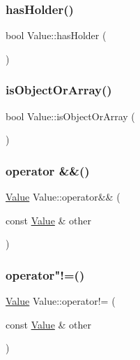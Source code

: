 \mbox{\label{classValue_a9193333ebda6a44b426ebc24519473db}} 
\subsubsection{\texorpdfstring{has\+Holder()}{hasHolder()}}
{\footnotesize\ttfamily bool Value\+::has\+Holder (\begin{DoxyParamCaption}{ }\end{DoxyParamCaption})}

\mbox{\label{classValue_a37e1fe6c86dc755a3e000442c4949ab7}} 
\subsubsection{\texorpdfstring{is\+Object\+Or\+Array()}{isObjectOrArray()}}
{\footnotesize\ttfamily bool Value\+::is\+Object\+Or\+Array (\begin{DoxyParamCaption}{ }\end{DoxyParamCaption})}

\mbox{\label{classValue_a8550d0a2396c3222421fdd1aef7ff49b}} 
\subsubsection{\texorpdfstring{operator \&\&()}{operator \&\&()}}
{\footnotesize\ttfamily \hyperlink{classValue}{Value} Value\+::operator\&\& (\begin{DoxyParamCaption}\item[{const \hyperlink{classValue}{Value} \&}]{other }\end{DoxyParamCaption})}

\mbox{\label{classValue_a9ad57dde72c068377e6da67caec558a3}} 
\subsubsection{\texorpdfstring{operator"!=()}{operator!=()}}
{\footnotesize\ttfamily \hyperlink{classValue}{Value} Value\+::operator!= (\begin{DoxyParamCaption}\item[{const \hyperlink{classValue}{Value} \&}]{other }\end{DoxyParamCaption})}

